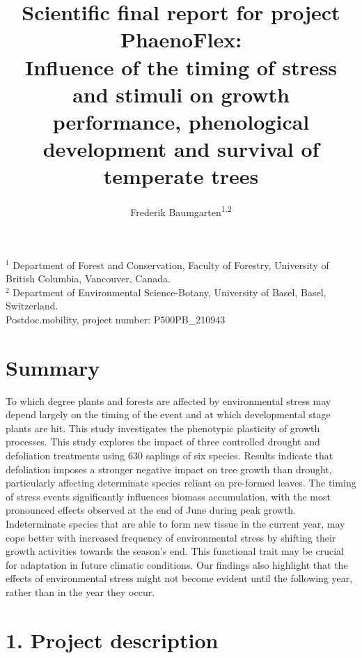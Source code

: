 \documentclass{article}
\begin{document}
	
	
	\title{Scientific final report for project PhaenoFlex: \\
		Influence of the timing of stress and stimuli on growth performance, phenological development and survival of temperate trees	%
	} 
	
	\author{Frederik Baumgarten\textsuperscript{1,2}}
	\maketitle
	
	$^1$ Department of Forest and Conservation, Faculty of Forestry, University of British Columbia, Vancouver, Canada. \\
	$^2$ Department of Environmental Science-Botany, University of Basel, Basel, Switzerland. \\
	
	Postdoc.mobility, project number: P500PB\_210943\\
	\section*{Summary} %
	To which degree plants and forests are affected by environmental stress may depend largely on the timing of the event and at which developmental stage plants are hit. This study investigates the phenotypic plasticity of growth processes. This study explores the impact of three controlled drought and defoliation treatments using 630 saplings of six species. Results indicate that defoliation imposes a stronger negative impact on tree growth than drought, particularly affecting determinate species reliant on pre-formed leaves. The timing of stress events significantly influences biomass accumulation, with the most pronounced effects observed at the end of June during peak growth. Indeterminate species that are able to form new tissue in the current year, may cope better with increased frequency of environmental stress by shifting their growth activities towards the season's end. This functional trait may be crucial for adaptation in future climatic conditions. 
	Our findings also highlight that the effects of environmental stress might not become evident until the following year, rather than in the year they occur.
	
	\section*{1. Project description}
	
\end{document}
